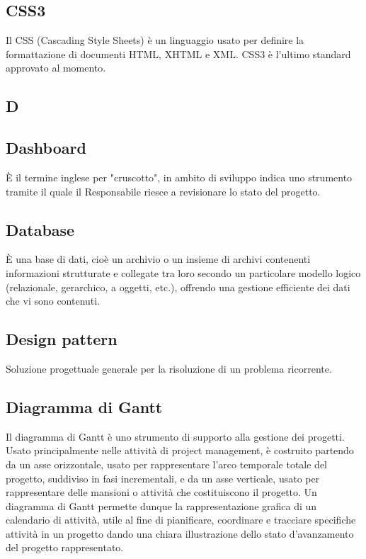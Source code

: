 \subsection*{CSS3}
Il CSS (Cascading Style Sheets) è un linguaggio usato per definire la formattazione di documenti HTML, XHTML e XML.
CSS3 è l'ultimo standard approvato al momento.

\newpage

\begin{center}
\Huge\section*{\uppercase{D}}
\end{center}

\subsection*{Dashboard}
È il termine inglese per "cruscotto", in ambito di sviluppo indica uno strumento
tramite il quale il Responsabile riesce a revisionare lo stato del progetto.

\subsection*{Database}
È una base di dati, cioè un archivio o un insieme di archivi contenenti informazioni
strutturate e collegate tra loro secondo un particolare modello logico (relazionale, gerarchico,
a oggetti, etc.), offrendo una gestione efficiente dei dati che vi sono contenuti.

\subsection*{Design pattern}
Soluzione progettuale generale per la risoluzione di un problema ricorrente.

\subsection*{Diagramma di Gantt}
Il diagramma di Gantt è uno strumento di supporto alla gestione dei
progetti. Usato principalmente nelle attività di project management, è costruito partendo da
un asse orizzontale, usato per rappresentare l'arco temporale totale del progetto, suddiviso
in fasi incrementali, e da un asse verticale, usato per rappresentare delle mansioni o attività
che costituiscono il progetto. Un diagramma di Gantt permette dunque la rappresentazione
grafica di un calendario di attività, utile al fine di pianificare, coordinare e tracciare specifiche
attività in un progetto dando una chiara illustrazione dello stato d'avanzamento del progetto
rappresentato.

